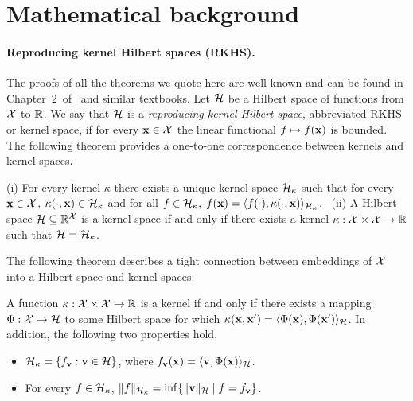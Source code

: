 \section{Mathematical background}\label{sec:math}
%
\paragraph*{Reproducing kernel Hilbert spaces (RKHS).}
%
The proofs of all the theorems we quote here are well-known and can be found
in Chapter~2~of~\citep{Saitoh88} and similar textbooks. Let ${\cal H}$ be a Hilbert space
of functions from ${\cal X}$ to ${\mathbb R}$. We say that ${\cal H}$ is a {\em reproducing
kernel Hilbert space}, abbreviated RKHS or kernel space, if for every ${\mathbf x}\in
{\cal X}$ the linear functional $f\mapsto{}f({\mathbf x})$ is bounded. The following theorem
provides a one-to-one correspondence between kernels and kernel spaces.
%
\begin{theorem}\label{thm:RKHS_basic}
%
(i) For every kernel $\kappa$ there exists a unique kernel space
${\cal H}_\kappa$ such that for every ${\mathbf x}\in {\cal X}$,
$\kappa(\cdot,{\mathbf x}) \in {\cal H}_\kappa$ and for all $f\in {\cal H}_\kappa,\;
f({\mathbf x}) = \langle f(\cdot),\kappa(\cdot,{\mathbf x})\rangle_{{\cal H}_\kappa}$.
\, (ii) A Hilbert space ${\cal H}\subseteq {\mathbb R}^{\cal X}$ is a kernel space if
and only if there exists a kernel $\kappa:{\cal X}\times {\cal X}\to {\mathbb R}$
such that ${\cal H}={\cal H}_\kappa$.
\end{theorem}
%
The following theorem describes a tight connection between embeddings
of ${\cal X}$ into a Hilbert space and kernel spaces.
%
\begin{theorem}\label{thm:RKHS_embedding}
%
A function $\kappa:{\cal X}\times {\cal X}\to{\mathbb R}$ is a kernel if and only if there
exists a mapping $\Phi:{\cal X}\to {\cal H}$ to some Hilbert space for which
$\kappa({\mathbf x},{\mathbf x}')=\langle \Phi({\mathbf x}),\Phi({\mathbf x}')\rangle_{{\cal H}}$. In addition, the
following two properties hold,
\begin{itemize}
\item ${\cal H}_\kappa=\{f_{\mathbf v} :{\mathbf v}\in  {\cal H}\}$,
  where $f_{\mathbf v}({\mathbf x})=\langle {\mathbf v},\Phi ({\mathbf x})\rangle_{{\cal H}}$.
\item For every $f\in {\cal H}_\kappa$,
  $\|f\|_{{\cal H}_\kappa} = \inf\{\|{\mathbf v}\|_{{\cal H}}\mid f=f_{\mathbf v}\}$.
\end{itemize}
\end{theorem}

